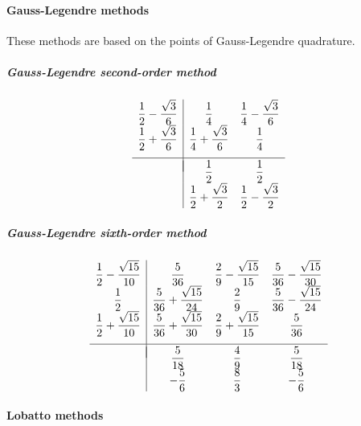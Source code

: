 \paragraph{Gauss-Legendre methods}
These methods are based on the points of Gauss-Legendre quadrature.

\subparagraph{Gauss-Legendre second-order method}
\begin{equation}
	\begin{array}{c|cc}
		\dfrac{1}{2}-\dfrac{\sqrt3}{6} &         \dfrac{1}{4}          & \dfrac{1}{4}-\dfrac{\sqrt3}{6} \\
		\dfrac{1}{2}+\dfrac{\sqrt3}{6} & \dfrac{1}{4}+\dfrac{\sqrt3}{6} &         \dfrac{1}{4}          \\[1em]
		\hline
		\\[-1em]		                               &         \dfrac{1}{2}          &         \dfrac{1}{2}          \\
		                               &   \dfrac{1}{2}+\dfrac{\sqrt{3}}{2}   &   \dfrac{1}{2}-\dfrac{\sqrt{3}}{2}
	\end{array}
	\label{eq::gauss-legendre_2}
\end{equation}

\subparagraph{Gauss-Legendre sixth-order method}
\begin{equation}
	\begin{array}{c|ccc}
		\dfrac{1}{2} - \dfrac{\sqrt{15}}{10} &            \dfrac{5}{36}             & \dfrac{2}{9}- \dfrac{\sqrt{15}}{15}  & \dfrac{5}{36} - \dfrac{\sqrt{15}}{30} \\
		           \dfrac{1}{2}             & \dfrac{5}{36} + \dfrac{\sqrt{15}}{24} &            \dfrac{2}{9}             & \dfrac{5}{36} - \dfrac{\sqrt{15}}{24} \\
		\dfrac{1}{2} + \dfrac{\sqrt{15}}{10} & \dfrac{5}{36} + \dfrac{\sqrt{15}}{30} & \dfrac{2}{9} + \dfrac{\sqrt{15}}{15} &            \dfrac{5}{36}      \\[1em]
		\hline
		\\[-1em]
		                                   &            \dfrac{5}{18}             &            \dfrac{4}{9}             &            \dfrac{5}{18}             \\
		                                   &              -\dfrac{5}{6}               &              \dfrac{8}{3}               &              -\dfrac{5}{6}
	\end{array}
	\label{eq::gauss-legendre_6}
\end{equation}

\paragraph{Lobatto methods}

